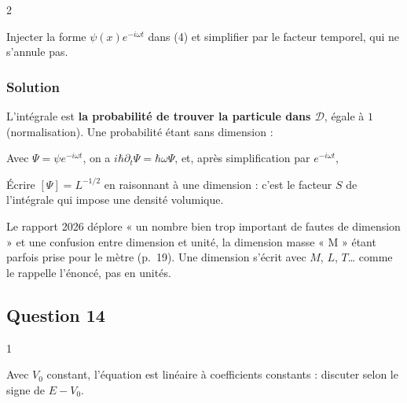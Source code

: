 \documentclass[11pt,a4paper]{article}
\newcommand{\equationajustee}[1]{%
  \sbox{\boiteequation}{$\displaystyle #1$}%
  \ifdim\wd\boiteequation>\linewidth
    \[\resizebox{\linewidth}{!}{\usebox{\boiteequation}}\]%
  \else
    \[#1\]%
  \fi}
\begin{document}
\begin{indication}{2}

Injecter la forme \(\psi(x)e^{-i\omega t}\) dans (4) et simplifier par le facteur temporel, qui ne s'annule pas.

\end{indication}

\hypertarget{solution-12}{%
\subsubsection{Solution}\label{solution-12}}

L'intégrale est \textbf{la probabilité de trouver la particule dans \(\mathscr D\)}, égale à \(1\) (normalisation). Une probabilité étant sans dimension :

\equationajustee{\boxed{[\Psi]=L^{-3/2}}}

Avec \(\Psi=\psi e^{-i\omega t}\), on a \(i\hbar\partial_t\Psi=\hbar\omega\Psi\), et, après simplification par \(e^{-i\omega t}\),

\equationajustee{\boxed{-\frac{\hbar^2}{2m}\frac{d^2\psi}{dx^2}+V(x)\psi=E\psi}}

\equationajustee{\boxed{E=\hbar\omega}}

\begin{piege}

Écrire \([\Psi]=L^{-1/2}\) en raisonnant à une dimension : c'est le facteur \(S\) de l'intégrale qui impose une densité volumique.

\end{piege}

\begin{jury}

Le rapport 2026 déplore « un nombre bien trop important de fautes de dimension » et une confusion entre dimension et unité, la dimension masse « M » étant parfois prise pour le mètre (p.~19). Une dimension s'écrit avec \(M\), \(L\), \(T\)\ldots{} comme le rappelle l'énoncé, pas en unités.

\end{jury}

\hypertarget{question-14}{%
\subsection{Question 14}\label{question-14}}

\begin{indication}{1}

Avec \(V_0\) constant, l'équation est linéaire à coefficients constants : discuter selon le signe de \(E-V_0\).

\end{indication}
\end{document}
